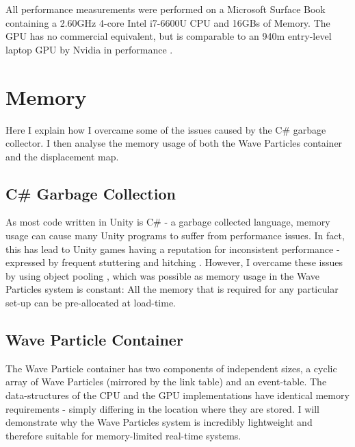 \documentclass[12pt,a4paper,twoside]{report}
\begin{document}
All performance measurements were performed on a Microsoft Surface Book
containing a 2.60GHz 4-core Intel i7-6600U CPU and 16GBs of Memory. The GPU
has no commercial equivalent, but is comparable to an 940m entry-level laptop
GPU by Nvidia in performance \cite{CNETSurfaceBookGPU}
\cite{HEXUSSurfaceBookGPU}.

\section{Memory}
\label{sec:evaluation_memory}

Here I explain how I overcame some of the issues caused by the
C\# garbage collector. I then analyse the memory usage of both the Wave
Particles container and the displacement map.


\subsection{C\# Garbage Collection}

As most code written in Unity is C\# - a garbage collected language, memory
usage can cause many Unity programs to suffer from performance issues. In fact,
this has lead to Unity games having a reputation for inconsistent performance -
expressed by frequent stuttering and hitching \cite{FirewatchDF}
\cite{WhyUnityNeogaf}. However, I overcame these issues by using object pooling
\cite{UnityObjectPooling}, which was possible as memory usage in the Wave
Particles system is constant: All the memory that is required for any
particular set-up can be pre-allocated at load-time.

\subsection{Wave Particle Container}

The Wave Particle container has two components of independent sizes, a cyclic
array of Wave Particles (mirrored by the link table) and an event-table. The
data-structures of the CPU and the GPU implementations have identical memory
requirements - simply differing in the location where they are stored. I will
demonstrate why the Wave Particles system is incredibly lightweight and
therefore suitable for memory-limited real-time systems.
\end{document}
